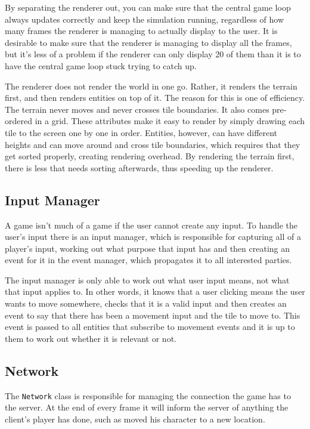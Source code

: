 By separating the renderer out, you can make sure that the central game loop always updates correctly and keep the simulation running, regardless of how many frames the renderer is managing to actually display to the user. It is desirable to make sure that the renderer is managing to display all the frames, but it's less of a problem if the renderer can only display 20 of them than it is to have the central game loop stuck trying to catch up.

The renderer does not render the world in one go. Rather, it renders the terrain first, and then renders entities on top of it. The reason for this is one of efficiency. The terrain never moves and never crosses tile boundaries. It also comes pre-ordered in a grid. These attributes make it easy to render by simply drawing each tile to the screen one by one in order. Entities, however, can have different heights and can move around and cross tile boundaries, which requires that they get sorted properly, creating rendering overhead. By rendering the terrain first, there is less that needs sorting afterwards, thus speeding up the renderer.

\subsection{Input Manager}
A game isn't much of a game if the user cannot create any input. To handle the user's input there is an input manager, which is responsible for capturing all of a player's input, working out what purpose that input has and then creating an event for it in the event manager, which propagates it to all interested parties.

The input manager is only able to work out what user input means, not what that input applies to. In other words, it knows that a user clicking means the user wants to move somewhere, checks that it is a valid input and then creates an event to say that there has been a movement input and the tile to move to. This event is passed to all entities that subscribe to movement events and it is up to them to work out whether it is relevant or not.

\subsection{Network}
The \texttt{Network} class is responsible for managing the connection the game has to the server. At the end of every frame it will inform the server of anything the client's player has done, such as moved his character to a new location.

